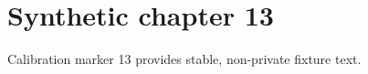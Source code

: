 \chapter{Synthetic chapter 13}\label{chap:13}
Calibration marker 13 provides stable, non-private fixture text.
